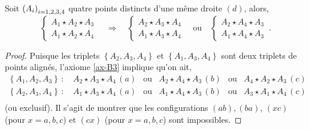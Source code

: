 \begin{cor}\label{cor-configurationuncote}
    Soit $\left(A_{i}\right)_{i = 1,2,3,4}$ quatre points distincts d'une même droite $(d)$, alors,
    \begin{equation*}
        \left\{
        \begin{array}{cc}
             A_1 \star A_2 \star A_3  \\
             A_1 \star A_2 \star A_4 
        \end{array}
        \right. \quad \Longrightarrow \quad       
        \left\{\begin{array}{cc}
             A_2 \star A_3 \star A_4  \\
             A_1 \star A_3 \star A_4 
        \end{array}\right. \quad \text{ou} \quad
        \left\{\begin{array}{cc}
             A_2 \star A_4 \star A_3  \\
             A_1 \star A_4 \star A_3 
        \end{array}\right.\,.
    \end{equation*}
    \begin{proof}
        Puisque les triplets $\left\{A_2,A_3,A_4\right\}$ et $\left\{A_1,A_3,A_4\right\}$ sont deux triplets de points alignés, l'axiome \ref{ax-B3} implique qu'on ait,
        \begin{equation*}
            \begin{array}{cccccc}
                 \left\{A_1,A_2,A_3\right\}\,:\,& A_2 \star A_3 \star A_4 \,(a) & \text{ou} & A_2 \star A_4 \star A_3 \,(b) & \text{ou} & A_4 \star A_2 \star A_3 \,(c) \\
                 \left\{A_2,A_3,A_4\right\}\,:\,& A_1 \star A_3 \star A_4 \,(a) & \text{ou} & A_1 \star A_4 \star A_3 \,(b) & \text{ou} & A_3 \star A_1 \star A_4 \,(c) \\
            \end{array}
        \end{equation*}
        (ou exclusif). Il s'agit de montrer que les configurations $(ab),(ba)$, $(xc)$ (pour $x=a,b,c$) et $(cx)$ (pour $x=a,b,c$) sont impossibles.


\end{proof}
\end{cor}
